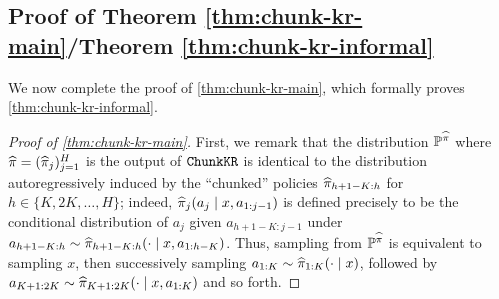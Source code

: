 


\subsection{Proof of Theorem \ref*{thm:chunk-kr-main}/Theorem \ref*{thm:chunk-kr-informal}}\label{subsec:chunkkr-proof}

We now complete the proof of \cref{thm:chunk-kr-main}, which formally proves \cref{thm:chunk-kr-informal}.

\begin{proof}[Proof of \cref{thm:chunk-kr-main}]
First, we remark that the distribution $\mathbb{P}^{\widehat{\pi}}$ where $\widehat{\pi} = (\widehat{\pi}_j)_{j=1}^H$ is the output of $\texttt{ChunkKR}$ is identical to the distribution autoregressively induced by the ``chunked'' policies $\widehat{\pi}_{h+1-K:h}$ for $h \in \{K,2K,\dots,H\}$; indeed, $\widehat{\pi}_j(a_j\mid{} x,a_{1:j-1})$ is defined precisely to be the conditional distribution of $a_j$ given $a_{h+1-K:j-1}$ under $a_{h+1-K:h} \sim \widehat{\pi}_{h+1-K:h}(\cdot\mid{}x,a_{1:h-K})$. Thus, sampling from $\mathbb{P}^{\widehat{\pi}}$ is equivalent to sampling $x$, then successively sampling $a_{1:K} \sim \widehat{\pi}_{1:K}(\cdot\mid{}x)$, followed by $a_{K+1:2K} \sim \widehat{\pi}_{K+1:2K}(\cdot\mid{}x,a_{1:K})$ and so forth.


\end{proof}
